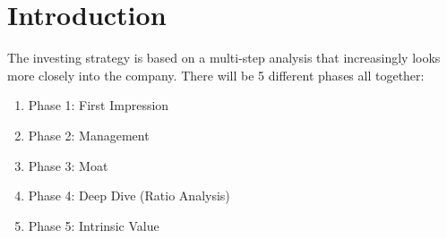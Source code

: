 \section{Introduction}

The investing strategy is based on a multi-step analysis that increasingly looks
more closely into the company. There will be 5 different phases all together:

\begin{enumerate}
	\item Phase 1: First Impression
	\item Phase 2: Management
	\item Phase 3: Moat
	\item Phase 4: Deep Dive (Ratio Analysis)
	\item Phase 5: Intrinsic Value
\end{enumerate}